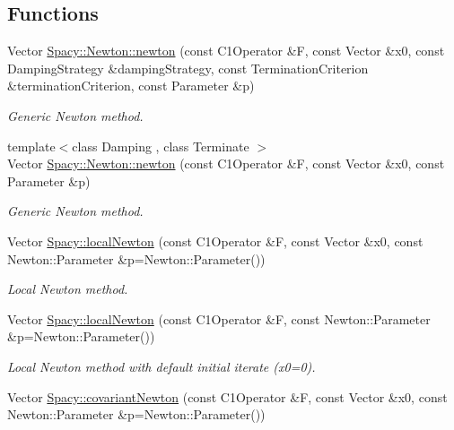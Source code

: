\subsection*{Functions}
\begin{DoxyCompactItemize}
\item 
Vector \hyperlink{group__NewtonGroup_gac1e03448966c56b3a119f9bea07e6dd6_gac1e03448966c56b3a119f9bea07e6dd6}{Spacy\+::\+Newton\+::newton} (const C1\+Operator \&F, const Vector \&x0, const Damping\+Strategy \&damping\+Strategy, const Termination\+Criterion \&termination\+Criterion, const Parameter \&p)
\begin{DoxyCompactList}\small\item\em Generic Newton method. \end{DoxyCompactList}\item 
{\footnotesize template$<$class Damping , class Terminate $>$ }\\Vector \hyperlink{group__NewtonGroup_ga39c7915072931fafca5d3012aa6349bf_ga39c7915072931fafca5d3012aa6349bf}{Spacy\+::\+Newton\+::newton} (const C1\+Operator \&F, const Vector \&x0, const Parameter \&p)
\begin{DoxyCompactList}\small\item\em Generic Newton method. \end{DoxyCompactList}\item 
Vector \hyperlink{group__NewtonGroup_ga448b8e78b2e84ed78e70c42114ea7599_ga448b8e78b2e84ed78e70c42114ea7599}{Spacy\+::local\+Newton} (const C1\+Operator \&F, const Vector \&x0, const Newton\+::\+Parameter \&p=Newton\+::\+Parameter())
\begin{DoxyCompactList}\small\item\em Local Newton method. \end{DoxyCompactList}\item 
Vector \hyperlink{group__NewtonGroup_gafbe5e25f46f7b0d237f5e9971cef998a_gafbe5e25f46f7b0d237f5e9971cef998a}{Spacy\+::local\+Newton} (const C1\+Operator \&F, const Newton\+::\+Parameter \&p=Newton\+::\+Parameter())
\begin{DoxyCompactList}\small\item\em Local Newton method with default initial iterate (x0=0). \end{DoxyCompactList}\item 
Vector \hyperlink{group__NewtonGroup_gab9d1c5b64e93d7ac051f8a7b41bf520a_gab9d1c5b64e93d7ac051f8a7b41bf520a}{Spacy\+::covariant\+Newton} (const C1\+Operator \&F, const Vector \&x0, const Newton\+::\+Parameter \&p=Newton\+::\+Parameter())

\end{DoxyCompactItemize}
